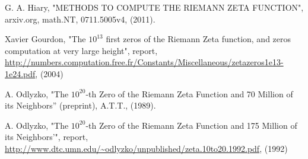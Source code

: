 \documentclass[twoside]{article}
\begin{document}
\begin{thebibliography}{10}
 G. A. Hiary,
"METHODS TO COMPUTE THE RIEMANN ZETA
FUNCTION", arxiv.org, math.NT, 0711.5005v4, (2011).

 Xavier Gourdon,
"The $10^{13}$ first zeros of the Riemann Zeta function,
and zeros computation at very large height", report,
\url{http://numbers.computation.free.fr/Constants/Miscellaneous/zetazeros1e13-1e24.pdf}, (2004)

 A. Odlyzko, "The $10^{20}$-th Zero of the Riemann Zeta
Function and 70 Million of its Neighbors'' (preprint), A.T.T., (1989).


  A. Odlyzko,
"The $10^{20}$-th Zero of the Riemann Zeta
Function and 175 Million of its Neighbors'", report,
\url{http://www.dtc.umn.edu/~odlyzko/unpublished/zeta.10to20.1992.pdf}, (1992)


\end{thebibliography} 
\end{document}
